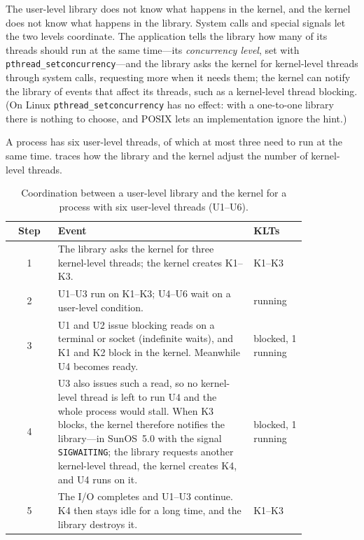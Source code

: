 \documentclass[../main.tex]{subfiles}
\begin{document}
The user-level library does not know what happens in the kernel, and the
kernel does not know what happens in the library.  System
calls and special signals let the two levels coordinate.  The application
tells the library how many of its threads should run at the same
time---its \emph{concurrency level}, set with
\texttt{pthread\_setconcurrency}---and the library asks the kernel for
kernel-level threads through system calls, requesting more when it needs
them; the kernel can notify the library of events that affect its threads,
such as a kernel-level thread blocking.  (On Linux
\texttt{pthread\_setconcurrency} has no effect: with a one-to-one library
there is nothing to choose, and POSIX lets an implementation ignore the
hint.)

\begin{example}
  A process has six user-level threads, of which at most three need to run
  at the same time.   traces how the library and
  the kernel adjust the number of kernel-level threads.
\end{example}

\begin{table}[htbp]
  \centering
  \caption{Coordination between a user-level library and the kernel for a
    process with six user-level threads (U1--U6).}
  \label{tab:l05-interaction}
  \small
  \begin{tabular}{@{}c>{\raggedright\arraybackslash}p{0.66\linewidth}>{\raggedright\arraybackslash}p{0.18\linewidth}@{}}
    \toprule
    Step & Event & KLTs \\
    \midrule
    1 & The library asks the kernel for three kernel-level threads; the
        kernel creates K1--K3. & K1--K3 \\
    2 & U1--U3 run on K1--K3; U4--U6 wait on a user-level condition. &
        3 running \\
    3 & U1 and U2 issue blocking reads on a terminal or socket
        (indefinite waits), and K1 and K2 block in the kernel.  Meanwhile
        U4 becomes ready. & 2 blocked, 1 running \\
    4 & U3 also issues such a read, so no kernel-level thread is
        left to run U4 and the whole process would stall.  When K3 blocks,
        the kernel therefore notifies the library---in SunOS~5.0 with the
        signal \texttt{SIGWAITING}; the library requests another
        kernel-level thread, the kernel creates K4, and U4 runs on it. &
        3 blocked, 1 running \\
    5 & The I/O completes and U1--U3 continue.  K4 then stays idle for a
        long time, and the library destroys it. & K1--K3 \\
    \bottomrule
  \end{tabular}
\end{table}
\end{document}
